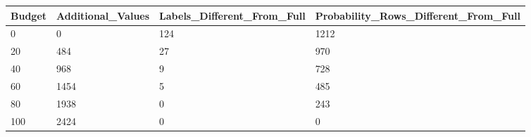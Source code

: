 \begin{tabular}{llll}
\toprule
Budget & Additional\_Values & Labels\_Different\_From\_Full & Probability\_Rows\_Different\_From\_Full \\
\midrule
0 & 0 & 124 & 1212 \\
20 & 484 & 27 & 970 \\
40 & 968 & 9 & 728 \\
60 & 1454 & 5 & 485 \\
80 & 1938 & 0 & 243 \\
100 & 2424 & 0 & 0 \\
\bottomrule
\end{tabular}